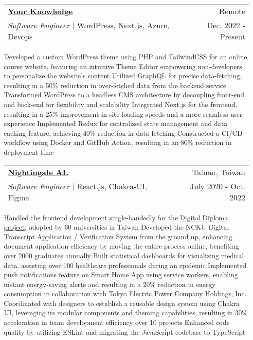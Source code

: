 \newcommand{\resumeExpEntry}[5]{
  \vspace{5pt}\item
    \begin{tabular*}{0.97\textwidth}{l@{\extracolsep{\fill}}r}
      \textbf{#1} & \small #2 \\
      \textit{#3} | #4 & \small #5 \\
    \end{tabular*}\vspace{-5pt}
}

\resumeExpEntry
{\href{https://yourknowledge.online}{Your Knowledge}}
{Remote}
{Software Engineer}
{WordPress, Next.js, Azure, Devops}
{Dec. 2022 - Present}
{
  \resumeItemListStart
    \resumeItem
    {Developed a custom WordPress theme using PHP and TailwindCSS for an online course website, featuring an intuitive Theme Editor empowering non-developers to personalize the website's content}
    \resumeItem
    {Utilized GraphQL for precise data-fetching, resulting in a 50\% reduction in over-fetched data from the backend service}
    \resumeItem
    {Transformed WordPress to a headless CMS architecture by decoupling front-end and back-end for flexibility and scalability}
    \resumeItem
    {Integrated Next.js for the frontend, resulting in a 25\% improvement in site loading speeds and a more seamless user experience}
    \resumeItem
    {Implemented Redux for centralized state management and data caching feature, achieving 40\% reduction in data fetching}
    \resumeItem
    {Constructed a CI/CD workflow using Docker and GitHub Action, resulting in an 80\% reduction in deployment time}
  \resumeItemListEnd
}

\resumeExpEntry
{\href{https://19gale.ai}{Nightingale AI.}}
{Tainan, Taiwan}
{Software Engineer}
{React.js, Chakra-UI, Figma}
{July 2020 - Oct. 2022}
{
  \resumeItemListStart
    \resumeItem
    {Handled the frontend development single-handedly for the \href{https://dcert.moe.gov.tw}{Digital Diploma project}, adopted by 60 universities in Taiwan}
    \resumeItem
    {Developed the NCKU Digital Transcript \href{https://stuapply.diploma.ncku.edu.tw/release}{Application} / \href{https://stuapply.diploma.ncku.edu.tw/verify}{Verification} System from the ground up, enhancing document application efficiency by moving the entire process online, benefiting over 2000 graduates annually}
    \resumeItem
    {Built statistical dashboards for visualizing medical data, assisting over 100 healthcare professionals during an epidemic}
    \resumeItem
    {Implemented push notifications feature on Smart Home App using service workers, enabling instant energy-saving alerts and resulting in a 20\% reduction in energy consumption in collaboration with Tokyo Electric Power Company Holdings, Inc.}
    \resumeItem
    {Coordinated with designers to establish a reusable design system using Chakra UI, leveraging its modular components and theming capabilities, resulting in 30\% acceleration in team development efficiency over 10 projects}
    \resumeItem
    {Enhanced code quality by utilizing ESLint and migrating the JavaScript codebase to TypeScript}
  \resumeItemListEnd
}

